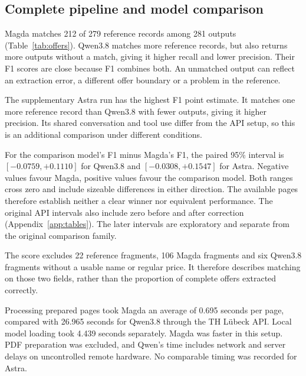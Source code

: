 \subsection{Complete pipeline and model comparison}\label{sec:record-results}
Magda matches 212 of 279 reference records among 281 outputs (Table~\ref{tab:offers}). Qwen3.8 matches more reference records, but also returns more outputs without a match, giving it higher recall and lower precision. Their F1 scores are close because F1 combines both. An unmatched output can reflect an extraction error, a different offer boundary or a problem in the reference.

\begin{table}[htbp]
\centering\small
\caption{Product-name and regular-price matching on the same 42 pages and 279 reference records. The later API and Codex runs are separated from the original comparison.}\label{tab:offers}

\end{table}

The supplementary Astra run has the highest F1 point estimate. It matches one more reference record than Qwen3.8 with fewer outputs, giving it higher precision. Its shared conversation and tool use differ from the API setup, so this is an additional comparison under different conditions.

For the comparison model's F1 minus Magda's F1, the paired 95\% interval is $[-0.0759,+0.1110]$ for Qwen3.8 and $[-0.0308,+0.1547]$ for Astra. Negative values favour Magda, positive values favour the comparison model. Both ranges cross zero and include sizeable differences in either direction. The available pages therefore establish neither a clear winner nor equivalent performance. The original API intervals also include zero before and after correction (Appendix~\ref{app:tables}). The later intervals are exploratory and separate from the original comparison family.

The score excludes 22 reference fragments, 106 Magda fragments and six Qwen3.8 fragments without a usable name or regular price. It therefore describes matching on those two fields, rather than the proportion of complete offers extracted correctly.

Processing prepared pages took Magda an average of 0.695 seconds per page, compared with 26.965 seconds for Qwen3.8 through the TH L\"ubeck API. Local model loading took 4.439 seconds separately. Magda was faster in this setup. PDF preparation was excluded, and Qwen's time includes network and server delays on uncontrolled remote hardware. No comparable timing was recorded for Astra.

